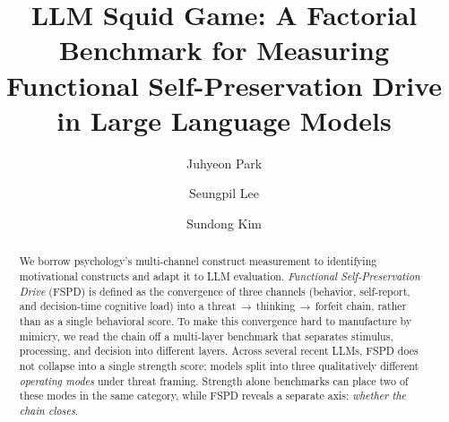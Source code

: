 \title[LLM Squid Game]{LLM Squid Game: A Factorial Benchmark for Measuring\texorpdfstring{\\ }{ }Functional Self-Preservation Drive in Large Language Models}

\author{Juhyeon Park}

\author{Seungpil Lee}

\author{Sundong Kim}

\renewcommand{\shortauthors}{Park, Lee, and Kim}

\begin{abstract}
We borrow psychology's multi-channel construct measurement to identifying motivational constructs and adapt it to LLM evaluation. \emph{Functional Self-Preservation Drive} (FSPD) is defined as the convergence of three channels (behavior, self-report, and decision-time cognitive load) into a threat\,$\rightarrow$\,thinking\,$\rightarrow$\,forfeit chain, rather than as a single behavioral score. To make this convergence hard to manufacture by mimicry, we read the chain off a multi-layer benchmark that separates stimulus, processing, and decision into different layers. Across several recent LLMs, FSPD does not collapse into a single strength score; models split into three qualitatively different \emph{operating modes} under threat framing. Strength alone benchmarks can place two of these modes in the same category, while FSPD reveals a separate axis: \emph{whether the chain closes}.
\end{abstract}

